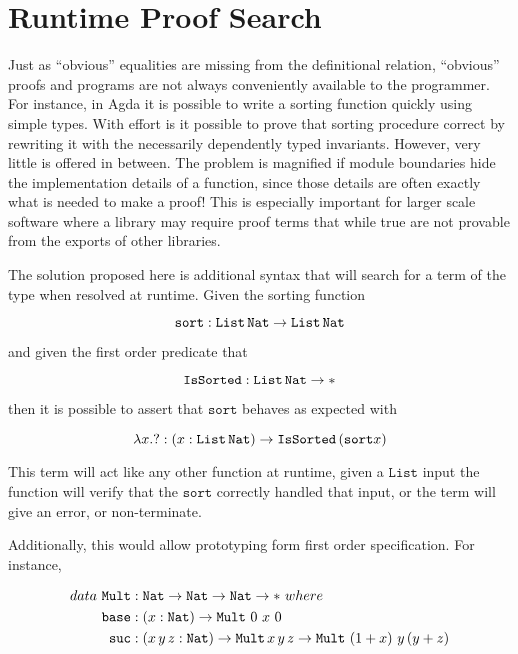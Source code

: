\section{Runtime Proof Search}

Just as ``obvious'' equalities are missing from the definitional relation, ``obvious'' proofs and programs are not always conveniently available to the programmer.
For instance, in Agda it is possible to write a sorting function quickly using simple types.
With effort is it possible to prove that sorting procedure correct by rewriting it with the necessarily dependently typed invariants.
However, very little is offered in between.
The problem is magnified if module boundaries hide the implementation details of a function, since those details are often exactly what is needed to make a proof!
This is especially important for larger scale software where a library may require proof terms that while true are not provable from the exports of other libraries.

The solution proposed here is additional syntax that will search for a term of the type when resolved at runtime.
Given the sorting function 

\[
\mathtt{sort}:\mathtt{List}\,\mathtt{Nat}{}\rightarrow\mathtt{List}\,\mathtt{Nat}{}
\]

and given the first order predicate that 

\[
\mathtt{IsSorted}:\mathtt{List}\,\mathtt{Nat}{}\rightarrow*
\]

then it is possible to assert that $\mathtt{sort}$ behaves as expected with

\[
\lambda x.?:\left(x:\mathtt{List}\,\mathtt{Nat}{}\right)\rightarrow\mathtt{IsSorted}\left(\mathtt{sort}x\right)
\]

This term will act like any other function at runtime, given a $\mathtt{List}$ input the function will verify that the $\mathtt{sort}$ correctly handled that input, or the term will give an error, or non-terminate.

Additionally, this would allow prototyping form first order specification.
For instance,

\begin{align*}
data\ \mathtt{Mult} & :\Nat{}\rightarrow\Nat{}\rightarrow\Nat{}\rightarrow*\ where\\
\mathtt{base} & :\left(x:\Nat{}\right)\rightarrow\mathtt{Mult}\ 0\ x\ 0\\
\mathtt{suc} & :\left(x\,y\,z:\Nat{}\right)\rightarrow\mathtt{Mult}\,x\,y\,z\rightarrow\mathtt{Mult}\,\left(1+x\right)\,y\,(y+z)
\end{align*}

